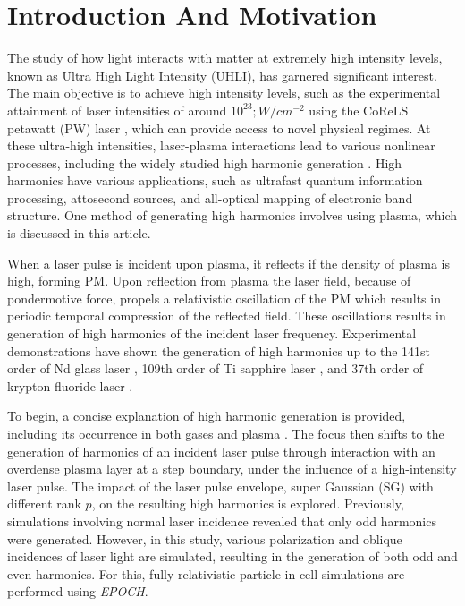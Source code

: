 \documentclass[12pt]{article}
\begin{document}
\section{Introduction And Motivation}
The study of how light interacts with matter at extremely high intensity levels, known as Ultra High Light Intensity (UHLI), has garnered significant interest.  The main objective is to achieve high intensity levels, such as the experimental attainment of laser intensities of around $10^{23} ; W/cm^{-2}$ using the CoReLS petawatt (PW) laser \cite{highintensity}, which can provide access to novel physical regimes. At these ultra-high intensities, laser-plasma interactions lead to various nonlinear processes, including the widely studied high harmonic generation \cite{henri}. High harmonics have various applications, such as ultrafast quantum information processing, attosecond sources, and all-optical mapping of electronic band structure. One method of generating high harmonics involves using plasma, which is discussed in this article.

When a laser pulse is incident upon plasma, it reflects if the density of plasma is high, forming PM. Upon reflection from plasma the laser field, because of pondermotive force, propels a relativistic oscillation of the PM which results in periodic temporal compression of the reflected field. These oscillations results in generation of high harmonics of the incident laser frequency.\cite{lichters} Experimental demonstrations have shown the generation of high harmonics up to the 141st order of Nd glass laser \cite{hormonics1}, 109th order of Ti sapphire laser \cite{hormonics2}, and 37th order of krypton fluoride laser \cite{hormonics3}.

To begin, a concise explanation of high harmonic generation is provided, including its occurrence in both gases \cite{gas-main}\cite{gas-second}\cite{hhg-book} and plasma \cite{hhg-relativistic}\cite{hhg-main}\cite{hhg-second}\cite{history-similarity}\cite{universal-spectra}. The focus then shifts to the generation of harmonics of an incident laser pulse through interaction with an overdense plasma layer at a step boundary, under the influence of a high-intensity laser pulse. The impact of the laser pulse envelope, super Gaussian (SG) with different rank $p$, on the resulting high harmonics is explored. Previously, simulations involving normal laser incidence revealed that only odd harmonics were generated. However, in this study, various polarization and oblique incidences of laser light are simulated, resulting in the generation of both odd and even harmonics. For this, fully relativistic particle-in-cell simulations are performed using \textit{EPOCH}\cite{EPOCH}.
\end{document}
